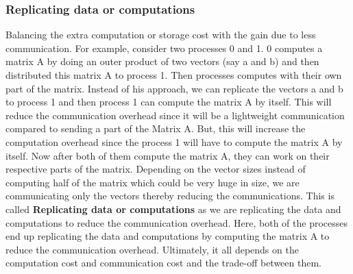 \documentclass[12pt]{book}
\begin{document}
\subsubsection{Replicating data or computations }
Balancing the extra computation or storage cost with the gain due to less communication.
For example, consider two processes 0 and 1. 0 computes a matrix A by doing an outer product of two vectors (say a and b) and then distributed this matrix A to process 1.
Then processes computes with their own part of the matrix. 
Instead of his approach, we can replicate the vectors a and b to process 1 and then process 1 can compute the matrix A by itself. This will reduce the communication overhead 
since it will be a lightweight communication compared to sending a part of the Matrix A. But, this will increase the computation overhead since the process 1 will have to compute the matrix A by itself.
Now after both of them compute the matrix A, they can work on their respective parts of the matrix. Depending on the vector sizes instead of computing half of the matrix which could be very huge in size,
we are communicating only the vectors thereby reducing the communications. This is called \textbf{Replicating data or computations} as we are replicating the data and computations to reduce the communication overhead. Here, 
both of the processes end up replicating the data and computations by computing the matrix A to reduce the communication overhead. Ultimately, it all depends on the computation cost and communication cost and the trade-off between them.
\end{document}
